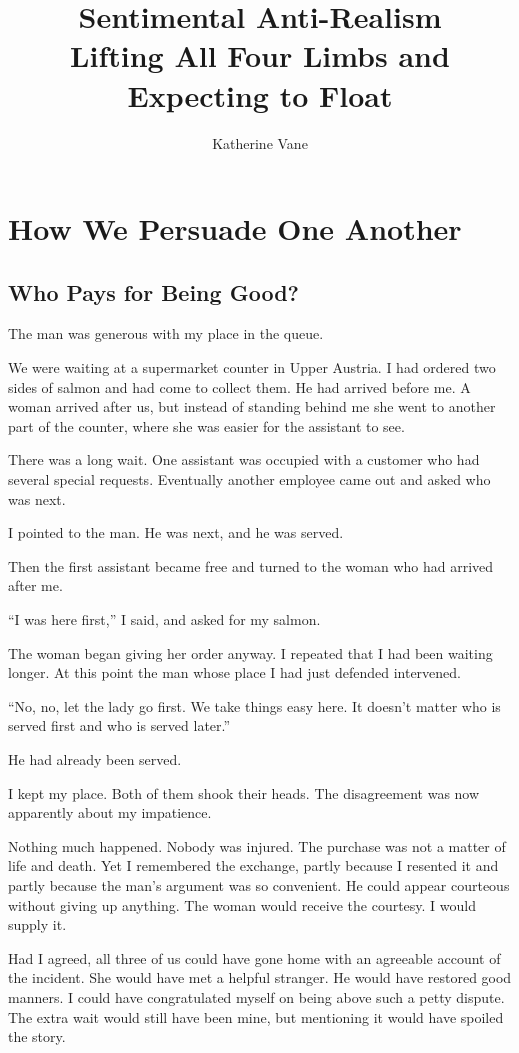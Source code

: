 \documentclass[12pt,a4paper]{book}
\title{Sentimental Anti-Realism\\[0.6em]\large Lifting All Four Limbs and Expecting to Float}
\author{Katherine Vane}
\date{}
\begin{document}
\maketitle
\begingroup
{}
\tableofcontents
\endgroup
\part{How We Persuade One Another}

\chapter{Who Pays for Being Good?}

The man was generous with my place in the queue.

We were waiting at a supermarket counter in Upper Austria. I had ordered two sides of salmon and had come to collect them. He had arrived before me. A woman arrived after us, but instead of standing behind me she went to another part of the counter, where she was easier for the assistant to see.

There was a long wait. One assistant was occupied with a customer who had several special requests. Eventually another employee came out and asked who was next.

I pointed to the man. He was next, and he was served.

Then the first assistant became free and turned to the woman who had arrived after me.

``I was here first,'' I said, and asked for my salmon.

The woman began giving her order anyway. I repeated that I had been waiting longer. At this point the man whose place I had just defended intervened.

``No, no, let the lady go first. We take things easy here. It doesn't matter who is served first and who is served later.''

He had already been served.

I kept my place. Both of them shook their heads. The disagreement was now apparently about my impatience.

Nothing much happened. Nobody was injured. The purchase was not a matter of life and death. Yet I remembered the exchange, partly because I resented it and partly because the man's argument was so convenient. He could appear courteous without giving up anything. The woman would receive the courtesy. I would supply it.

Had I agreed, all three of us could have gone home with an agreeable account of the incident. She would have met a helpful stranger. He would have restored good manners. I could have congratulated myself on being above such a petty dispute. The extra wait would still have been mine, but mentioning it would have spoiled the story.
\end{document}
